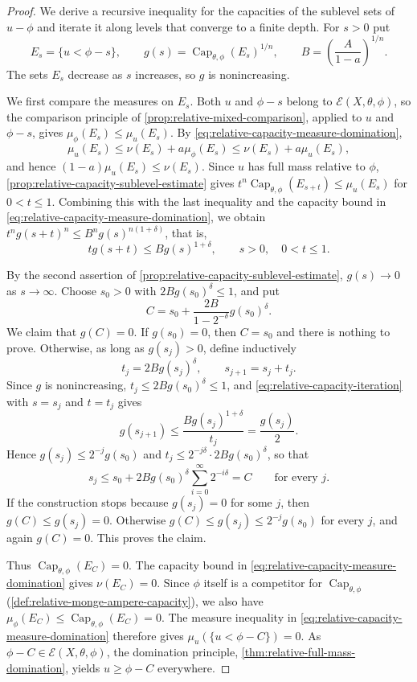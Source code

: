 \begin{proof}
We derive a recursive inequality for the capacities of the sublevel sets of $u-\phi$ and iterate it along levels that converge to a finite depth. For $s>0$ put
\[
 E_s=\{u<\phi-s\},\qquad g(s)=\operatorname{Cap}_{\theta,\phi}(E_s)^{1/n},\qquad B=\left(\frac A{1-a}\right)^{1/n}.
\]
The sets $E_s$ decrease as $s$ increases, so $g$ is nonincreasing.

We first compare the measures on $E_s$. Both $u$ and $\phi-s$ belong to $\mathcal E(X,\theta,\phi)$, so the comparison principle of \cref{prop:relative-mixed-comparison}, applied to $u$ and $\phi-s$, gives $\mu_\phi(E_s)\leq\mu_u(E_s)$. By \eqref{eq:relative-capacity-measure-domination},
\[
 \mu_u(E_s)\leq\nu(E_s)+a\mu_\phi(E_s)\leq\nu(E_s)+a\mu_u(E_s),
\]
and hence $(1-a)\mu_u(E_s)\leq\nu(E_s)$. Since $u$ has full mass relative to $\phi$, \cref{prop:relative-capacity-sublevel-estimate} gives $t^n\operatorname{Cap}_{\theta,\phi}(E_{s+t})\leq\mu_u(E_s)$ for $0<t\leq1$. Combining this with the last inequality and the capacity bound in \eqref{eq:relative-capacity-measure-domination}, we obtain $t^ng(s+t)^n\leq B^ng(s)^{n(1+\delta)}$, that is,
\begin{equation}\label{eq:relative-capacity-iteration}
 t g(s+t)\leq B g(s)^{1+\delta},\qquad s>0,\quad0<t\leq1.
\end{equation}

By the second assertion of \cref{prop:relative-capacity-sublevel-estimate}, $g(s)\to0$ as $s\to\infty$. Choose $s_0>0$ with $2Bg(s_0)^\delta\leq1$, and put
\begin{equation}\label{eq:relative-capacity-explicit-depth}
 C=s_0+\frac{2B}{1-2^{-\delta}}g(s_0)^\delta.
\end{equation}
We claim that $g(C)=0$. If $g(s_0)=0$, then $C=s_0$ and there is nothing to prove. Otherwise, as long as $g(s_j)>0$, define inductively
\[
 t_j=2B g(s_j)^\delta,\qquad s_{j+1}=s_j+t_j.
\]
Since $g$ is nonincreasing, $t_j\leq2Bg(s_0)^\delta\leq1$, and \eqref{eq:relative-capacity-iteration} with $s=s_j$ and $t=t_j$ gives
\[
 g(s_{j+1})\leq\frac{Bg(s_j)^{1+\delta}}{t_j}=\frac{g(s_j)}2.
\]
Hence $g(s_j)\leq2^{-j}g(s_0)$ and $t_j\leq2^{-j\delta}\cdot2Bg(s_0)^\delta$, so that
\[
 s_j\leq s_0+2B g(s_0)^\delta\sum_{i=0}^\infty2^{-i\delta}=C
 \qquad\text{for every }j.
\]
If the construction stops because $g(s_j)=0$ for some $j$, then $g(C)\leq g(s_j)=0$. Otherwise $g(C)\leq g(s_j)\leq2^{-j}g(s_0)$ for every $j$, and again $g(C)=0$. This proves the claim.

Thus $\operatorname{Cap}_{\theta,\phi}(E_C)=0$. The capacity bound in \eqref{eq:relative-capacity-measure-domination} gives $\nu(E_C)=0$. Since $\phi$ itself is a competitor for $\operatorname{Cap}_{\theta,\phi}$ (\cref{def:relative-monge-ampere-capacity}), we also have $\mu_\phi(E_C)\leq\operatorname{Cap}_{\theta,\phi}(E_C)=0$. The measure inequality in \eqref{eq:relative-capacity-measure-domination} therefore gives $\mu_u(\{u<\phi-C\})=0$. As $\phi-C\in\mathcal E(X,\theta,\phi)$, the domination principle, \cref{thm:relative-full-mass-domination}, yields $u\geq\phi-C$ everywhere.


\end{proof}
